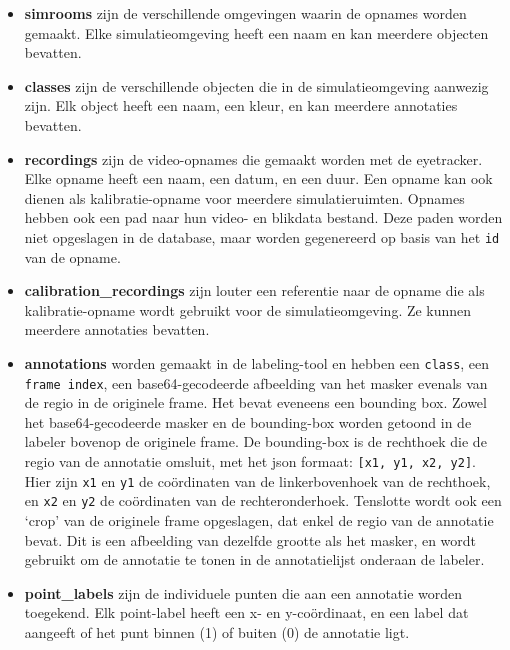 \begin{itemize}
  \item \textbf{simrooms} zijn de verschillende omgevingen waarin de opnames worden gemaakt. 
  Elke simulatieomgeving heeft een naam en kan meerdere objecten bevatten.
  \item \textbf{classes} zijn de verschillende objecten die in de simulatieomgeving aanwezig zijn. 
  Elk object heeft een naam, een kleur, en kan meerdere annotaties bevatten.
  \item \textbf{recordings} zijn de video-opnames die gemaakt worden met de eyetracker. 
  Elke opname heeft een naam, een datum, en een duur. 
  Een opname kan ook dienen als kalibratie-opname voor meerdere simulatieruimten. 
  Opnames hebben ook een pad naar hun video- en blikdata bestand. 
  Deze paden worden niet opgeslagen in de database, maar worden gegenereerd op basis van het \texttt{id} van de opname. 
  \item \textbf{calibration\_recordings} zijn louter een referentie naar de opname die als kalibratie-opname wordt gebruikt 
  voor de simulatieomgeving. Ze kunnen meerdere annotaties bevatten.
  \item \textbf{annotations} worden gemaakt in de labeling-tool en hebben een \texttt{class}, een \texttt{frame index}, 
  een base64-gecodeerde afbeelding van het masker evenals van de regio in de originele frame. Het bevat eveneens een bounding box. Zowel het base64-gecodeerde 
  masker en de bounding-box worden getoond in de labeler bovenop de originele frame. De bounding-box is de rechthoek die de regio van de 
  annotatie omsluit, met het json formaat: \texttt{[x1, y1, x2, y2]}. Hier zijn \texttt{x1} en \texttt{y1} de coördinaten van de 
  linkerbovenhoek van de rechthoek, en \texttt{x2} en \texttt{y2} de coördinaten van de rechteronderhoek. 
  Tenslotte wordt ook een `crop' van de originele frame opgeslagen, dat enkel de regio van de annotatie bevat. 
  Dit is een afbeelding van dezelfde grootte als het masker, en wordt gebruikt om de annotatie te tonen in de annotatielijst onderaan de labeler.
  \item \textbf{point\_labels} zijn de individuele punten die aan een annotatie worden toegekend. Elk point-label heeft een x- en y-coördinaat, en een label dat aangeeft of het punt binnen (1) of buiten (0) de annotatie ligt.
\end{itemize}

